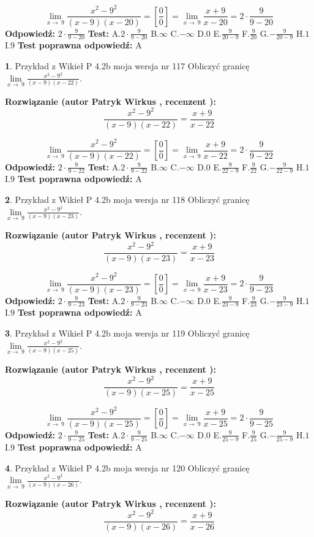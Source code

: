 \documentclass[12pt, a4paper]{article}
\theoremstyle{definition} %
\newtheorem{zad}{}
\newcommand{\zadStart}[1]{\begin{zad}#1\newline}
\newcommand{\zadStop}{\end{zad}}
\newcommand{\rozwStart}[2]{\noindent \textbf{Rozwiązanie (autor #1 , recenzent #2): }\newline}
\newcommand{\rozwStop}{\newline}
\newcommand{\odpStart}{\noindent \textbf{Odpowiedź:}\newline}
\newcommand{\odpStop}{\newline}
\newcommand{\testStart}{\noindent \textbf{Test:}\newline}
\newcommand{\testStop}{\newline}
\newcommand{\kluczStart}{\noindent \textbf{Test poprawna odpowiedź:}\newline}
\newcommand{\kluczStop}{\newline}
\begin{document}
$$\lim\limits_{x\to\ 9}\frac{x^{2}-9^{2}}{(x-9)(x-20)}=[\frac{0}{0}]=\lim\limits_{x\to\ 9}\frac{x+9}{x-20}=2 \cdot \frac{9}{9-20}$$
\rozwStop
\odpStart
$2 \cdot \frac{9}{9-20}$
\odpStop
\testStart
A.$2 \cdot \frac{9}{9-20}$
B.$\infty$
C.$-\infty$
D.$0$
E.$\frac{9}{20-9}$
F.$\frac{9}{20}$
G.$-\frac{9}{20-9}$
H.$1$
I.$9$
\testStop
\kluczStart
A
\kluczStop



\zadStart{Przykład z Wikieł P 4.2b moja wersja nr 117}
Obliczyć granicę $\lim\limits_{x\to\ 9}\frac{x^{2}-9^{2}}{(x-9)(x-22)}$.
\zadStop
\rozwStart{Patryk Wirkus}{}
$$\frac{x^{2}-9^{2}}{(x-9)(x-22)}=\frac{x+9}{x-22}$$

$$\lim\limits_{x\to\ 9}\frac{x^{2}-9^{2}}{(x-9)(x-22)}=[\frac{0}{0}]=\lim\limits_{x\to\ 9}\frac{x+9}{x-22}=2 \cdot \frac{9}{9-22}$$
\rozwStop
\odpStart
$2 \cdot \frac{9}{9-22}$
\odpStop
\testStart
A.$2 \cdot \frac{9}{9-22}$
B.$\infty$
C.$-\infty$
D.$0$
E.$\frac{9}{22-9}$
F.$\frac{9}{22}$
G.$-\frac{9}{22-9}$
H.$1$
I.$9$
\testStop
\kluczStart
A
\kluczStop



\zadStart{Przykład z Wikieł P 4.2b moja wersja nr 118}
Obliczyć granicę $\lim\limits_{x\to\ 9}\frac{x^{2}-9^{2}}{(x-9)(x-23)}$.
\zadStop
\rozwStart{Patryk Wirkus}{}
$$\frac{x^{2}-9^{2}}{(x-9)(x-23)}=\frac{x+9}{x-23}$$

$$\lim\limits_{x\to\ 9}\frac{x^{2}-9^{2}}{(x-9)(x-23)}=[\frac{0}{0}]=\lim\limits_{x\to\ 9}\frac{x+9}{x-23}=2 \cdot \frac{9}{9-23}$$
\rozwStop
\odpStart
$2 \cdot \frac{9}{9-23}$
\odpStop
\testStart
A.$2 \cdot \frac{9}{9-23}$
B.$\infty$
C.$-\infty$
D.$0$
E.$\frac{9}{23-9}$
F.$\frac{9}{23}$
G.$-\frac{9}{23-9}$
H.$1$
I.$9$
\testStop
\kluczStart
A
\kluczStop



\zadStart{Przykład z Wikieł P 4.2b moja wersja nr 119}
Obliczyć granicę $\lim\limits_{x\to\ 9}\frac{x^{2}-9^{2}}{(x-9)(x-25)}$.
\zadStop
\rozwStart{Patryk Wirkus}{}
$$\frac{x^{2}-9^{2}}{(x-9)(x-25)}=\frac{x+9}{x-25}$$

$$\lim\limits_{x\to\ 9}\frac{x^{2}-9^{2}}{(x-9)(x-25)}=[\frac{0}{0}]=\lim\limits_{x\to\ 9}\frac{x+9}{x-25}=2 \cdot \frac{9}{9-25}$$
\rozwStop
\odpStart
$2 \cdot \frac{9}{9-25}$
\odpStop
\testStart
A.$2 \cdot \frac{9}{9-25}$
B.$\infty$
C.$-\infty$
D.$0$
E.$\frac{9}{25-9}$
F.$\frac{9}{25}$
G.$-\frac{9}{25-9}$
H.$1$
I.$9$
\testStop
\kluczStart
A
\kluczStop



\zadStart{Przykład z Wikieł P 4.2b moja wersja nr 120}
Obliczyć granicę $\lim\limits_{x\to\ 9}\frac{x^{2}-9^{2}}{(x-9)(x-26)}$.
\zadStop
\rozwStart{Patryk Wirkus}{}
$$\frac{x^{2}-9^{2}}{(x-9)(x-26)}=\frac{x+9}{x-26}$$
\end{document}
